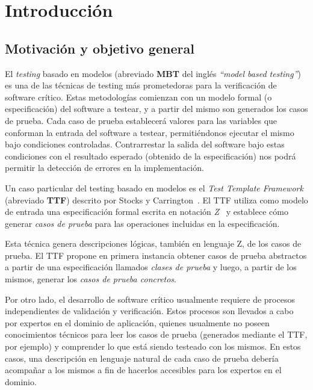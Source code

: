 \chapter{Introducción}
\label{introduccion}

\section{Motivación y objetivo general}
El \textit{testing} basado en modelos (abreviado \textbf{MBT} del inglés \emph{``model based testing''}) es una de las técnicas de testing más prometedoras para la verificación de software crítico. Estas metodologías comienzan con un modelo formal (o especificación) del software a testear, y a partir del mismo son generados los casos de prueba. Cada caso de prueba establecerá valores para las variables que conforman la entrada del software a testear, permitiéndonos ejecutar el mismo bajo condiciones controladas. Contrarrestar la salida del software bajo estas condiciones con el resultado esperado (obtenido de la especificación) nos podrá permitir la detección de errores en la implementación.

Un caso particular del testing basado en modelos es el \emph{Test Template Framework} (abreviado \textbf{TTF}) descrito por Stocks y Carrington~\cite{stocks}. El TTF utiliza como modelo de entrada una especificación formal escrita en notación \emph{Z}~\cite{spivey} y establece cómo generar \emph{casos de prueba} para las operaciones incluidas en la especificación. 

Esta técnica genera descripciones lógicas, también en lenguaje Z, de los casos de prueba. El TTF propone en primera instancia obtener casos de prueba abstractos a partir de una especificación llamados \emph{clases de prueba} y luego, a partir de los mismos, generar los \emph{casos de prueba concretos}.

Por otro lado, el desarrollo de software crítico usualmente requiere de procesos independientes de validación y verificación. Estos procesos son llevados a cabo por expertos en el dominio de aplicación, quienes usualmente no poseen conocimientos técnicos para leer los casos de prueba (generados mediante el TTF, por ejemplo) y comprender lo que está siendo testeado con los mismos. En estos casos, una descripción en lenguaje natural de cada caso de prueba debería acompañar a los mismos a fin de hacerlos accesibles para los expertos en el dominio.  

